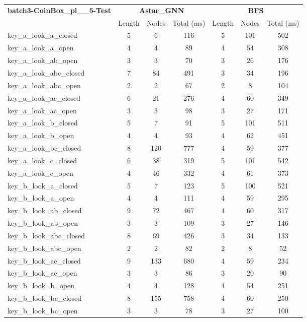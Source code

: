 \begin{table}[!ht]
\centering
\small
\begin{tabular}{l|ccc|ccc}
\multirow{2}{*}{\textbf{batch3-CoinBox\_pl\_\_5-Test}} & \multicolumn{3}{c|}{\textbf{Astar\_GNN}} & \multicolumn{3}{c}{\textbf{BFS}} \\
\cline{2-7}
& Length & Nodes & Total (ms) & Length & Nodes & Total (ms) \\
\hline
key\_a\_look\_a\_closed & 5 & 6 & 116 & 5 & 101 & 502 \\
key\_a\_look\_a\_open & 4 & 4 & 89 & 4 & 54 & 308 \\
key\_a\_look\_ab\_open & 3 & 3 & 70 & 3 & 26 & 176 \\
key\_a\_look\_abc\_closed & 7 & 84 & 491 & 3 & 34 & 196 \\
key\_a\_look\_abc\_open & 2 & 2 & 67 & 2 & 8 & 104 \\
key\_a\_look\_ac\_closed & 6 & 21 & 276 & 4 & 60 & 349 \\
key\_a\_look\_ac\_open & 3 & 3 & 98 & 3 & 27 & 171 \\
key\_a\_look\_b\_closed & 5 & 7 & 91 & 5 & 101 & 511 \\
key\_a\_look\_b\_open & 4 & 4 & 93 & 4 & 62 & 451 \\
key\_a\_look\_bc\_closed & 8 & 120 & 777 & 4 & 59 & 377 \\
key\_a\_look\_c\_closed & 6 & 38 & 319 & 5 & 101 & 542 \\
key\_a\_look\_c\_open & 4 & 46 & 332 & 4 & 61 & 373 \\
key\_b\_look\_a\_closed & 5 & 7 & 123 & 5 & 100 & 521 \\
key\_b\_look\_a\_open & 4 & 4 & 111 & 4 & 59 & 295 \\
key\_b\_look\_ab\_closed & 9 & 72 & 467 & 4 & 60 & 317 \\
key\_b\_look\_ab\_open & 3 & 3 & 109 & 3 & 27 & 146 \\
key\_b\_look\_abc\_closed & 8 & 69 & 426 & 3 & 34 & 133 \\
key\_b\_look\_abc\_open & 2 & 2 & 82 & 2 & 8 & 52 \\
key\_b\_look\_ac\_closed & 9 & 133 & 680 & 4 & 59 & 234 \\
key\_b\_look\_ac\_open & 3 & 3 & 86 & 3 & 20 & 90 \\
key\_b\_look\_b\_open & 4 & 4 & 128 & 4 & 54 & 251 \\
key\_b\_look\_bc\_closed & 8 & 155 & 758 & 4 & 60 & 250 \\
key\_b\_look\_bc\_open & 3 & 3 & 78 & 3 & 27 & 100 \\

\end{tabular}
\end{table}
